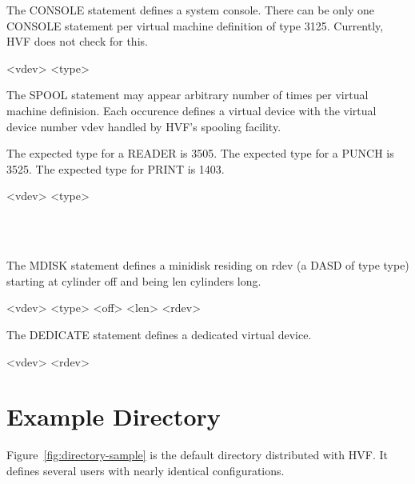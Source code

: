 \cbstart
The CONSOLE statement defines a system console.  There can be only one
CONSOLE statement per virtual machine definition of type 3125.  Currently,
HVF does not check for this.

\begin{syntdiag}
 <vdev> <type>
\end{syntdiag}

The SPOOL statement may appear arbitrary number of times per virtual machine
definision.  Each occurence defines a virtual device with the virtual device
number vdev handled by HVF's spooling facility.

The expected type for a READER is 3505.  The expected type for a PUNCH is
3525.  The expected type for PRINT is 1403.

\begin{syntdiag}
 <vdev> <type>
\begin{stack}
	\\
	 \\
\end{stack}
\end{syntdiag}

The MDISK statement defines a minidisk residing on rdev (a DASD of type
type) starting at cylinder off and being len cylinders long.

\begin{syntdiag}
 <vdev> <type> <off> <len> <rdev>
\end{syntdiag}

The DEDICATE statement defines a dedicated virtual device.

\begin{syntdiag}
 <vdev> <rdev>
\end{syntdiag}
\cbend

\section{Example Directory}
Figure~\ref{fig:directory-sample} is the default directory distributed with
HVF.  It defines several users with nearly identical configurations.

\begin{figure*}[htb]
\small

\captionfont
\caption{\capfont Example directory defining three users.}
\label{fig:directory-sample}
\end{figure*}

